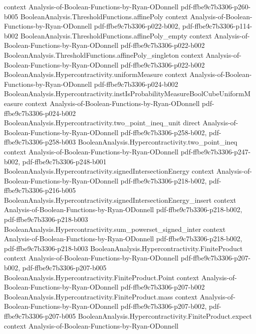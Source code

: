 \begin{theorem}
  {context}
  {Analysis-of-Boolean-Functions-by-Ryan-ODonnell}
  {pdf-ffbe9c7b3306-p260-b005}
\proofstep
  {BooleanAnalysis.ThresholdFunctions.affinePoly}
  {context}
  {Analysis-of-Boolean-Functions-by-Ryan-ODonnell}
  {pdf-ffbe9c7b3306-p022-b002,
    pdf-ffbe9c7b3306-p114-b002}
\proofstep
  {BooleanAnalysis.ThresholdFunctions.affinePoly_empty}
  {context}
  {Analysis-of-Boolean-Functions-by-Ryan-ODonnell}
  {pdf-ffbe9c7b3306-p022-b002}
\proofstep
  {BooleanAnalysis.ThresholdFunctions.affinePoly_singleton}
  {context}
  {Analysis-of-Boolean-Functions-by-Ryan-ODonnell}
  {pdf-ffbe9c7b3306-p022-b002}
\proofstep
  {BooleanAnalysis.Hypercontractivity.uniformMeasure}
  {context}
  {Analysis-of-Boolean-Functions-by-Ryan-ODonnell}
  {pdf-ffbe9c7b3306-p024-b002}
\proofstep
  {BooleanAnalysis.Hypercontractivity.instIsProbabilityMeasureBoolCubeUniformMeasure}
  {context}
  {Analysis-of-Boolean-Functions-by-Ryan-ODonnell}
  {pdf-ffbe9c7b3306-p024-b002}
\proofstep
  {BooleanAnalysis.Hypercontractivity.two_point_ineq_unit}
  {direct}
  {Analysis-of-Boolean-Functions-by-Ryan-ODonnell}
  {pdf-ffbe9c7b3306-p258-b002,
    pdf-ffbe9c7b3306-p258-b003}
\proofstep
  {BooleanAnalysis.Hypercontractivity.two_point_ineq}
  {context}
  {Analysis-of-Boolean-Functions-by-Ryan-ODonnell}
  {pdf-ffbe9c7b3306-p247-b002,
    pdf-ffbe9c7b3306-p248-b001}
\proofstep
  {BooleanAnalysis.Hypercontractivity.signedIntersectionEnergy}
  {context}
  {Analysis-of-Boolean-Functions-by-Ryan-ODonnell}
  {pdf-ffbe9c7b3306-p218-b002,
    pdf-ffbe9c7b3306-p216-b005}
\proofstep
  {BooleanAnalysis.Hypercontractivity.signedIntersectionEnergy_insert}
  {context}
  {Analysis-of-Boolean-Functions-by-Ryan-ODonnell}
  {pdf-ffbe9c7b3306-p218-b002,
    pdf-ffbe9c7b3306-p218-b003}
\proofstep
  {BooleanAnalysis.Hypercontractivity.sum_powerset_signed_inter}
  {context}
  {Analysis-of-Boolean-Functions-by-Ryan-ODonnell}
  {pdf-ffbe9c7b3306-p218-b002,
    pdf-ffbe9c7b3306-p218-b003}
\proofstep
  {BooleanAnalysis.Hypercontractivity.FiniteProduct}
  {context}
  {Analysis-of-Boolean-Functions-by-Ryan-ODonnell}
  {pdf-ffbe9c7b3306-p207-b002,
    pdf-ffbe9c7b3306-p207-b005}
\proofstep
  {BooleanAnalysis.Hypercontractivity.FiniteProduct.Point}
  {context}
  {Analysis-of-Boolean-Functions-by-Ryan-ODonnell}
  {pdf-ffbe9c7b3306-p207-b002}
\proofstep
  {BooleanAnalysis.Hypercontractivity.FiniteProduct.mass}
  {context}
  {Analysis-of-Boolean-Functions-by-Ryan-ODonnell}
  {pdf-ffbe9c7b3306-p207-b002,
    pdf-ffbe9c7b3306-p207-b005}
\proofstep
  {BooleanAnalysis.Hypercontractivity.FiniteProduct.expect}
  {context}
  {Analysis-of-Boolean-Functions-by-Ryan-ODonnell}

\end{theorem}
